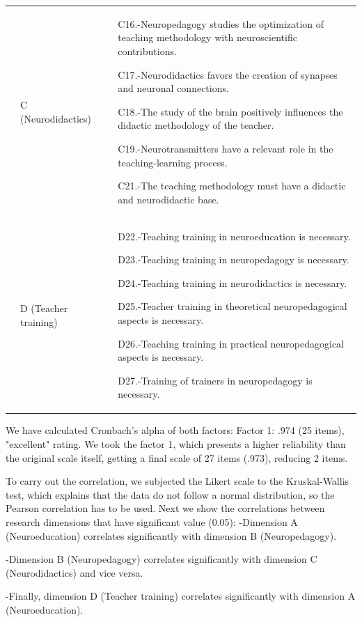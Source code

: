 \documentclass[english]{textolivre}
\begin{document}
\begin{table}[h!]
\begin{threeparttable}
\begin{tabular}{p{0.8cm} p{1.5cm} p{1.5cm} p{9.1cm}}
& C \newline (Neuro\-didactics) & & 
C16.-Neuropedagogy studies the optimization of teaching methodology with neuroscientific contributions.

C17.-Neurodidactics favors the creation of synapses and neuronal connections.

C18.-The study of the brain positively influences the didactic methodology of the teacher.

C19.-Neurotransmitters have a relevant role in the teaching-learning process.

C21.-The teaching methodology must have a didactic and neurodidactic base. \\

& D \newline (Teacher training) & & 

D22.-Teaching training in neuroeducation is necessary.

D23.-Teaching training in neuropedagogy is necessary.

D24.-Teaching training in neurodidactics is necessary.

D25.-Teacher training in theoretical neuropedagogical aspects is necessary.

D26.-Teaching training in practical neuropedagogical aspects is necessary.

D27.-Training of trainers in neuropedagogy is necessary.\\
\bottomrule
\end{tabular}
\end{threeparttable}
\end{table}

We have calculated Cronbach's alpha of both factors: Factor 1: .974 (25 items), "excellent" rating. We took the factor 1, which presents a higher reliability than the original scale itself, getting a final scale of 27 items (.973), reducing 2 items.

To carry out the correlation, we subjected the Likert scale to the Kruskal-Wallis test, which explains that the data do not follow a normal distribution, so the Pearson correlation has to be used. Next we show the correlations between research dimensions that have significant value (0.05):
-Dimension A (Neuroeducation) correlates significantly with dimension B (Neuropedagogy).

-Dimension B (Neuropedagogy) correlates significantly with dimension C (Neurodidactics) and vice versa.

-Finally, dimension D (Teacher training) correlates significantly with dimension A (Neuroeducation).
\end{document}
